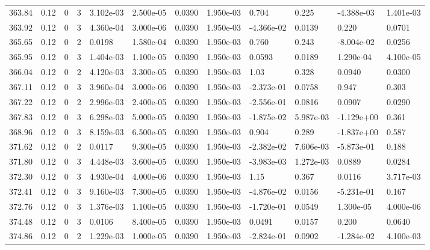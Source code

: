\documentclass[preview]{standalone}
\begin{document}
{{{{{{{{{{{{\begin{tabular}{L{1.2cm}C{1.2cm} C{0.3cm}C{0.5cm} C{1.4cm}C{1.4cm} C{1.4cm}C{1.4cm} C{1.6cm}C{1.6cm} C{1.6cm}C{1.6cm}}
  363.84  &  0.12  & 0     &  3 &  3.102e-03  & 2.500e-05  &  0.0390&   1.950e-03& 0.704 & 0.225   &  -4.388e-03 & 1.401e-03  \\ 
  363.92  &  0.12  & 0     &  3 &  4.360e-04  & 3.000e-06  &  0.0390&   1.950e-03& -4.366e-02 & 0.0139   &  0.220 & 0.0701  \\ 
  365.65  &  0.12  & 0     &  2 &  0.0198  & 1.580e-04  &  0.0390&   1.950e-03& 0.760 & 0.243   &  -8.004e-02 & 0.0256  \\ 
  365.95  &  0.12  & 0     &  3 &  1.404e-03  & 1.100e-05  &  0.0390&   1.950e-03& 0.0593 & 0.0189   &  1.290e-04 & 4.100e-05  \\ 
  366.04  &  0.12  & 0     &  2 &  4.120e-03  & 3.300e-05  &  0.0390&   1.950e-03& 1.03 & 0.328   &  0.0940 & 0.0300  \\ 
  367.11  &  0.12  & 0     &  3 &  3.960e-04  & 3.000e-06  &  0.0390&   1.950e-03& -2.373e-01 & 0.0758   &  0.947 & 0.303  \\ 
  367.22  &  0.12  & 0     &  2 &  2.996e-03  & 2.400e-05  &  0.0390&   1.950e-03& -2.556e-01 & 0.0816   &  0.0907 & 0.0290  \\ 
  367.83  &  0.12  & 0     &  3 &  6.298e-03  & 5.000e-05  &  0.0390&   1.950e-03& -1.875e-02 & 5.987e-03   &  -1.129e+00 & 0.361  \\ 
  368.96  &  0.12  & 0     &  3 &  8.159e-03  & 6.500e-05  &  0.0390&   1.950e-03& 0.904 & 0.289   &  -1.837e+00 & 0.587  \\ 
  371.62  &  0.12  & 0     &  2 &  0.0117  & 9.300e-05  &  0.0390&   1.950e-03& -2.382e-02 & 7.606e-03   &  -5.873e-01 & 0.188  \\ 
  371.80  &  0.12  & 0     &  3 &  4.448e-03  & 3.600e-05  &  0.0390&   1.950e-03& -3.983e-03 & 1.272e-03   &  0.0889 & 0.0284  \\ 
  372.30  &  0.12  & 0     &  3 &  4.930e-04  & 4.000e-06  &  0.0390&   1.950e-03& 1.15 & 0.367   &  0.0116 & 3.717e-03  \\ 
  372.41  &  0.12  & 0     &  3 &  9.160e-03  & 7.300e-05  &  0.0390&   1.950e-03& -4.876e-02 & 0.0156   &  -5.231e-01 & 0.167  \\ 
  372.76  &  0.12  & 0     &  3 &  1.376e-03  & 1.100e-05  &  0.0390&   1.950e-03& -1.720e-01 & 0.0549   &  1.300e-05 & 4.000e-06  \\ 
  374.48  &  0.12  & 0     &  3 &  0.0106  & 8.400e-05  &  0.0390&   1.950e-03& 0.0491 & 0.0157   &  0.200 & 0.0640  \\ 
  374.86  &  0.12  & 0     &  2 &  1.229e-03  & 1.000e-05  &  0.0390&   1.950e-03& -2.824e-01 & 0.0902   &  -1.284e-02 & 4.100e-03  \\ 

\end{tabular}}}}}}}}}}}}}
\end{document}
